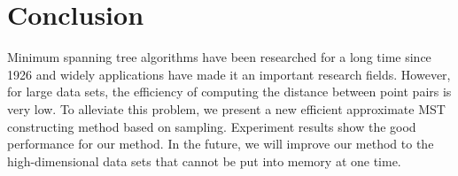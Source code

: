 \section{Conclusion}
 Minimum spanning tree algorithms have been researched for a long time since 1926 and widely applications have made it an important research fields. However, for large data sets, the efficiency of computing the distance between point pairs is very low. To alleviate this problem, we present a new efficient approximate MST constructing method based on sampling. Experiment results show the good performance for our method. In the future, we will improve our method to the high-dimensional data sets that cannot be put into memory at one time.